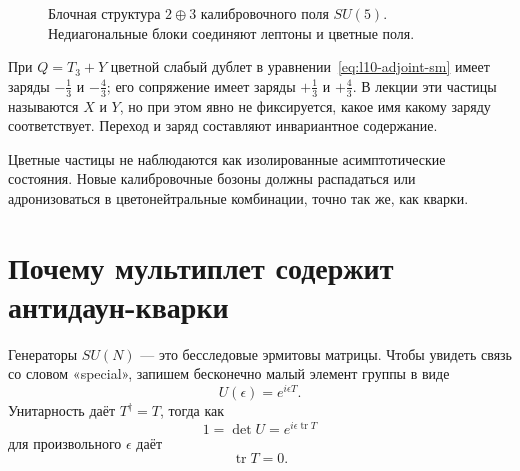 \begin{figure}[htbp]
\centering
{}
\caption{Блочная структура \(2\oplus3\) калибровочного поля \(SU(5)\). Недиагональные блоки соединяют лептоны и цветные поля.}
\label{fig:l10-gauge-blocks}
\end{figure}

При \(Q=T_3+Y\) цветной слабый дублет в уравнении~\eqref{eq:l10-adjoint-sm} имеет заряды \(-\tfrac13\) и \(-\tfrac43\); его сопряжение имеет заряды \(+\tfrac13\) и \(+\tfrac43\). В лекции эти частицы называются \(X\) и \(Y\), но при этом явно не фиксируется, какое имя какому заряду соответствует. Переход и заряд составляют инвариантное содержание.

\begin{classroomqa}
\end{classroomqa}

Цветные частицы не наблюдаются как изолированные асимптотические состояния. Новые калибровочные бозоны должны распадаться или адронизоваться в цветонейтральные комбинации, точно так же, как кварки.

\section{Почему мультиплет содержит антидаун-кварки}

Генераторы \(SU(N)\) — это бесследовые эрмитовы матрицы. Чтобы увидеть связь со словом «special», запишем бесконечно малый элемент группы в виде
\begin{equation}
U(\epsilon)=e^{i\epsilon T}.
\end{equation}
Унитарность даёт \(T^\dagger=T\), тогда как
\begin{equation}
1=\det U=e^{i\epsilon\operatorname{tr}T}
\end{equation}
для произвольного \(\epsilon\) даёт
\begin{equation}
\operatorname{tr}T=0.
\label{eq:l10-traceless-generator}
\end{equation}


